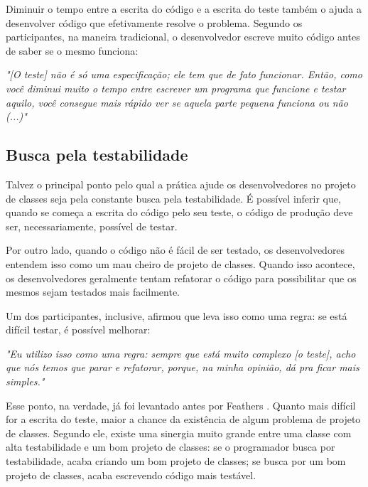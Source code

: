 \documentclass[conference]{IEEEtran}
\begin{document}
Diminuir o tempo entre a escrita do código e a escrita do teste também o ajuda a desenvolver código
que efetivamente resolve o problema. Segundo os participantes, na maneira tradicional, 
o desenvolvedor escreve muito código antes de saber se o mesmo funciona:

\begin{framed}
\textit{"[O teste] não é só uma especificação; ele tem que de fato funcionar. Então,
como você diminui muito o tempo entre escrever um programa que funcione e testar aquilo,
você consegue mais rápido ver se aquela parte pequena funciona ou não (...)"}
\end{framed}

\subsection{Busca pela testabilidade}

Talvez o principal ponto pelo qual a prática ajude os desenvolvedores no projeto de classes 
seja pela constante busca pela testabilidade. É possível inferir que, quando se 
começa a escrita do código pelo seu teste, o código de produção deve ser, necessariamente,
possível de testar.

Por outro lado, quando o código não é fácil de ser testado, os desenvolvedores
entendem isso como um mau cheiro de projeto de classes. Quando isso acontece,
os desenvolvedores geralmente tentam refatorar o código para possibilitar que
os mesmos sejam testados mais facilmente.

Um dos participantes, inclusive, afirmou que leva isso como uma regra:
se está difícil testar, é possível melhorar:

\begin{framed}
\textit{"Eu utilizo isso como uma regra: sempre que está muito complexo [o teste],
acho que nós temos que parar e refatorar, porque, na minha opinião, dá
pra ficar mais simples."}
\end{framed}

Esse ponto, na verdade, já foi levantado antes por Feathers \cite{feathers-synergy}.
Quanto mais difícil for a escrita do teste, maior a chance da existência de
algum problema de projeto de classes. Segundo ele, 
existe uma sinergia muito grande entre uma classe com alta testabilidade e um bom projeto de classes: 
se o programador busca por testabilidade, acaba criando um bom projeto de classes; se 
busca por um bom projeto de classes, acaba escrevendo código mais
testável.
\end{document}
